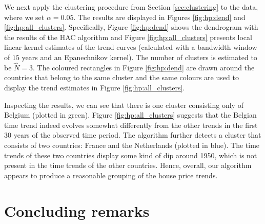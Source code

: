 \documentclass[12pt]{article}
\begin{document}
We next apply the clustering procedure from Section \ref{sec:clustering} to the data, where we set $\alpha = 0.05$. The results are displayed in Figures \ref{fig:hp:dend} and \ref{fig:hp:all_clusters}. Specifically, Figure \ref{fig:hp:dend} shows the dendrogram with the results of the HAC algorithm and Figure \ref{fig:hp:all_clusters} presents local linear kernel estimates of the trend curves (calculated with a bandwidth window of $15$ years and an Epanechnikov kernel). The number of clusters is estimated to be $\widehat{N} = 3$. The coloured rectangles in Figure \ref{fig:hp:dend} are drawn around the countries that belong to the same cluster and the same colours are used to display the trend estimates in Figure \ref{fig:hp:all_clusters}.


Inspecting the results, we can see that there is one cluster consisting only of Belgium (plotted in green). Figure \ref{fig:hp:all_clusters} suggests that the Belgian time trend indeed evolves somewhat differently from the other trends in the first $30$ years of the observed time period. %
The algorithm further detects a cluster that consists of two countries: France and the Netherlands (plotted in blue). The time trends of these two countries display some kind of dip around 1950, which is not present in the time trends of the other countries. 
Hence, overall, our algorithm appears to produce a reasonable grouping of the house price trends.



\section{Concluding remarks}
\end{document}
